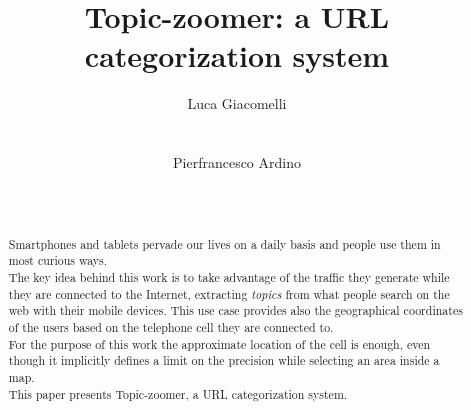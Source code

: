 \documentclass{sig-alternate-05-2015}
\begin{document}
\title{Topic-zoomer: a URL categorization system}

\author{
    \alignauthor
    Luca Giacomelli\\
           \\
           \\
    \alignauthor
    Pierfrancesco Ardino\\
           \\
           \\
    }
\maketitle


\begin{abstract}
Smartphones and tablets pervade our lives on a daily basis and people use them in most curious ways.\\
The key idea behind this work is to take advantage of the traffic they generate while they are connected to the Internet, extracting \emph{topics} from what people search on the web with their mobile devices. This use case provides also the geographical coordinates of the users based on the telephone cell they are connected to.\\
For the purpose of this work the approximate location of the cell is enough, even though it implicitly defines a limit on the precision while selecting an area inside a map.\\
This paper presents Topic-zoomer, a URL categorization system.
\end{abstract}


\printccsdesc
{}
\end{document}
